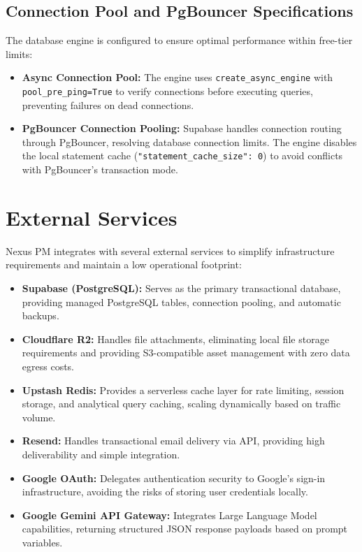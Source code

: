 \subsection{Connection Pool and PgBouncer Specifications}
The database engine is configured to ensure optimal performance within free-tier limits:
\begin{itemize}
    \item \textbf{Async Connection Pool:} The engine uses \texttt{create\_async\_engine} with \texttt{pool\_pre\_ping=True} to verify connections before executing queries, preventing failures on dead connections.
    \item \textbf{PgBouncer Connection Pooling:} Supabase handles connection routing through PgBouncer, resolving database connection limits. The engine disables the local statement cache (\texttt{"statement\_cache\_size": 0}) to avoid conflicts with PgBouncer's transaction mode.
\end{itemize}

\section{External Services}
Nexus PM integrates with several external services to simplify infrastructure requirements and maintain a low operational footprint:

\begin{itemize}
    \item \textbf{Supabase (PostgreSQL):} Serves as the primary transactional database, providing managed PostgreSQL tables, connection pooling, and automatic backups.
    \item \textbf{Cloudflare R2:} Handles file attachments, eliminating local file storage requirements and providing S3-compatible asset management with zero data egress costs.
    \item \textbf{Upstash Redis:} Provides a serverless cache layer for rate limiting, session storage, and analytical query caching, scaling dynamically based on traffic volume.
    \item \textbf{Resend:} Handles transactional email delivery via API, providing high deliverability and simple integration.
    \item \textbf{Google OAuth:} Delegates authentication security to Google's sign-in infrastructure, avoiding the risks of storing user credentials locally.
    \item \textbf{Google Gemini API Gateway:} Integrates Large Language Model capabilities, returning structured JSON response payloads based on prompt variables.
\end{itemize}

